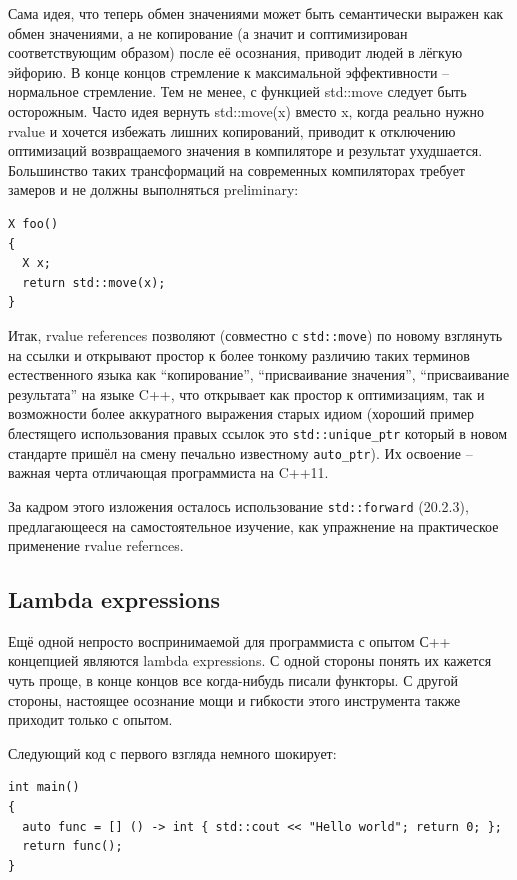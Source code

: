 \documentclass[a4paper,12pt,oneside]{article}
\begin{document}
Сама идея, что теперь обмен значениями может быть семантически выражен как обмен значениями, а не копирование (а значит и соптимизирован соответствующим образом) после её осознания, приводит людей в лёгкую эйфорию. В конце концов стремление к максимальной эффективности -- нормальное стремление. Тем не менее, с функцией std::move следует быть осторожным. Часто идея вернуть std::move(x) вместо x, когда реально нужно rvalue и хочется избежать лишних копирований, приводит к отключению оптимизаций возвращаемого значения в компиляторе и результат ухудшается. Большинство таких трансформаций на современных компиляторах требует замеров и не должны выполняться preliminary:

\begin{lstlisting}
X foo()
{
  X x;
  return std::move(x);
}
\end{lstlisting}

Итак, rvalue references позволяют (совместно с \lstinline!std::move!) по новому взглянуть на ссылки и открывают простор к более тонкому различию таких терминов естественного языка как ``копирование'', ``присваивание значения'', ``присваивание результата'' на языке C++, что открывает как простор к оптимизациям, так и возможности более аккуратного выражения старых идиом (хороший пример блестящего использования правых ссылок это \lstinline!std::unique_ptr! который в новом стандарте пришёл на смену печально известному \lstinline!auto_ptr!). Их освоение -- важная черта отличающая программиста на C++11.

За кадром этого изложения осталось использование \lstinline!std::forward! (20.2.3), предлагающееся на самостоятельное изучение, как упражнение на практическое применение rvalue refernces.

\subsection{Lambda expressions}

Ещё одной непросто воспринимаемой для программиста с опытом С++ концепцией являются lambda expressions. С одной стороны понять их кажется чуть проще, в конце концов все когда-нибудь писали функторы. С другой стороны, настоящее осознание мощи и гибкости этого инструмента также приходит только с опытом. 

Следующий код с первого взгляда немного шокирует:

\begin{lstlisting}
int main()
{
  auto func = [] () -> int { std::cout << "Hello world"; return 0; };
  return func(); 
}
\end{lstlisting}
\end{document}
